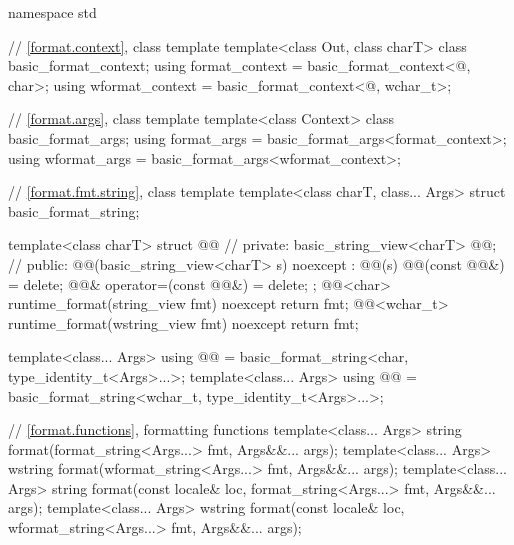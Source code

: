 %
%
%
%
%
%
%
%
%
%
\begin{codeblock}
namespace std {
  // \ref{format.context}, class template 
  template<class Out, class charT> class basic_format_context;
  using format_context = basic_format_context<@\unspec@, char>;
  using wformat_context = basic_format_context<@\unspec@, wchar_t>;

  // \ref{format.args}, class template 
  template<class Context> class basic_format_args;
  using format_args = basic_format_args<format_context>;
  using wformat_args = basic_format_args<wformat_context>;

  // \ref{format.fmt.string}, class template 
  template<class charT, class... Args>
    struct basic_format_string;

  template<class charT> struct @@ {                  // \expos
  private:
    basic_string_view<charT> @@;                                       // \expos
  public:
    @@(basic_string_view<charT> s) noexcept : @@(s) {}
    @@(const @@&) = delete;
    @@& operator=(const @@&) = delete;
  };
  @@<char> runtime_format(string_view fmt) noexcept { return fmt; }
  @@<wchar_t> runtime_format(wstring_view fmt) noexcept { return fmt; }

  template<class... Args>
    using @@ = basic_format_string<char, type_identity_t<Args>...>;
  template<class... Args>
    using @@ = basic_format_string<wchar_t, type_identity_t<Args>...>;

  // \ref{format.functions}, formatting functions
  template<class... Args>
    string format(format_string<Args...> fmt, Args&&... args);
  template<class... Args>
    wstring format(wformat_string<Args...> fmt, Args&&... args);
  template<class... Args>
    string format(const locale& loc, format_string<Args...> fmt, Args&&... args);
  template<class... Args>
    wstring format(const locale& loc, wformat_string<Args...> fmt, Args&&... args);

}
\end{codeblock}
